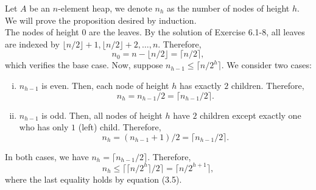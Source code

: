 \documentclass[12pt,reqno]{amsart}
\newif\ifanswer
\begin{document}
\begin{enumerate}[1.]
\ifanswer
{}
Let $A$ be an $n$-element heap, we denote $n_h$ as the number of nodes of height $h$. We will prove the proposition desired by induction.\\
The nodes of height 0 are the leaves. By the solution of Exercise 6.1-8, all leaves are indexed by $\lfloor n/2\rfloor+1, \lfloor n/2\rfloor+2, \dots, n$. Therefore,
$$
n_0 = n - \lfloor n/2\rfloor = \lceil n/2\rceil,
$$
which verifies the base case. Now, suppose $n_{h-1} \leq \lceil n/2^{h} \rceil$. We consider two cases:
\begin{enumerate}[(i)]
    \item $n_{h-1}$ is even. Then, each node of height $h$ has exactly $2$ children. Therefore,
    $$
    n_h = n_{h-1}/2 = \lceil n_{h-1}/2 \rceil.
    $$
    \item $n_{h-1}$ is odd. Then, all nodes of height $h$ have $2$ children except exactly one who has only $1$ (left) child. Therefore,
    $$
    n_h = (n_{h-1}+1)/2 = \lceil n_{h-1}/2 \rceil.
    $$
\end{enumerate}
In both cases, we have $n_h = \lceil n_{h-1}/2 \rceil$. Therefore,
$$
n_h \leq \lceil \lceil n/2^{h} \rceil/2 \rceil = \lceil n/2^{h+1} \rceil,
$$
where the last equality holds by equation (3.5).
\vspace{1cm}



\end{enumerate}
\end{document}
